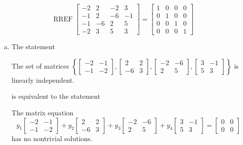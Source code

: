 \begin{exerciseAnswer} 


\[\operatorname{RREF} \left[\begin{array}{cccc}
-2 & 2 & -2 & 3 \\
-1 & 2 & -6 & -1 \\
-1 & -6 & 2 & 5 \\
-2 & 3 & 5 & 3
\end{array}\right] = \left[\begin{array}{cccc}
1 & 0 & 0 & 0 \\
0 & 1 & 0 & 0 \\
0 & 0 & 1 & 0 \\
0 & 0 & 0 & 1
\end{array}\right] \]


\begin{enumerate}[(a)]
\item The statement 
\begin{center}\begin{minipage}{0.8\textwidth}
 The set of matrices \( \left\{ \left[\begin{array}{cc}
-2 & -1 \\
-1 & -2
\end{array}\right] , \left[\begin{array}{cc}
2 & 2 \\
-6 & 3
\end{array}\right] , \left[\begin{array}{cc}
-2 & -6 \\
2 & 5
\end{array}\right] , \left[\begin{array}{cc}
3 & -1 \\
5 & 3
\end{array}\right] \right\} \) is linearly independent.
\end{minipage}\end{center}
     is equivalent to the statement 
\begin{center}\begin{minipage}{0.8\textwidth}
 The matrix equation \[ y_{1} \left[\begin{array}{cc}
-2 & -1 \\
-1 & -2
\end{array}\right] + y_{2} \left[\begin{array}{cc}
2 & 2 \\
-6 & 3
\end{array}\right] + y_{3} \left[\begin{array}{cc}
-2 & -6 \\
2 & 5
\end{array}\right] + y_{4} \left[\begin{array}{cc}
3 & -1 \\
5 & 3
\end{array}\right] = \left[\begin{array}{cc}
0 & 0 \\
0 & 0
\end{array}\right] \] has no nontrivial solutions. 
\end{minipage}\end{center}
    

\end{enumerate}
\end{exerciseAnswer}
